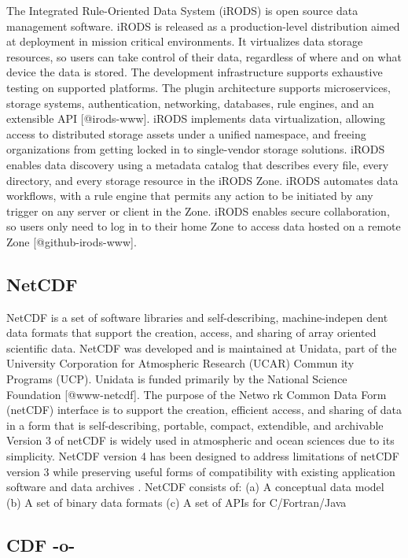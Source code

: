 The Integrated Rule-Oriented Data System (iRODS) is open source data
management software. iRODS is released as a production-level
distribution aimed at deployment in mission critical environments. It
virtualizes data storage resources, so users can take control of their
data, regardless of where and on what device the data is stored. The
development infrastructure supports exhaustive testing on supported
platforms. The plugin architecture supports microservices, storage
systems, authentication, networking, databases, rule engines, and an
extensible API [@irods-www].  iRODS implements data
virtualization, allowing access to distributed storage assets under a
unified namespace, and freeing organizations from getting locked in to
single-vendor storage solutions. iRODS enables data discovery using a
metadata catalog that describes every file, every directory, and every
storage resource in the iRODS Zone. iRODS automates data workflows,
with a rule engine that permits any action to be initiated by any
trigger on any server or client in the Zone. iRODS enables secure
collaboration, so users only need to log in to their home Zone to
access data hosted on a remote Zone [@github-irods-www].




\subsection{NetCDF}

NetCDF is a set of software libraries and self-describing,
machine-indepen dent data formats that support the creation, access,
and sharing of array oriented scientific data. NetCDF was developed
and is maintained at Unidata, part of the University Corporation for
Atmospheric Research (UCAR) Commun ity Programs (UCP). Unidata is
funded primarily by the National Science Foundation
\cite{paper-netCDF} [@www-netcdf]. The purpose of the Netwo rk
Common Data Form (netCDF) interface is to support the creation,
efficient access, and sharing of data in a form that is
self-describing, portable, compact, extendible, and archivable Version
3 of netCDF is widely used in atmospheric and ocean sciences due to
its simplicity. NetCDF version 4 has been designed to address
limitations of netCDF version 3 while preserving useful forms of
compatibility with existing application software and data archives
\cite{paper-netCDF}.  NetCDF consists of: (a) A conceptual data model
(b) A set of binary data formats (c) A set of APIs for C/Fortran/Java

\subsection{CDF -o-}

